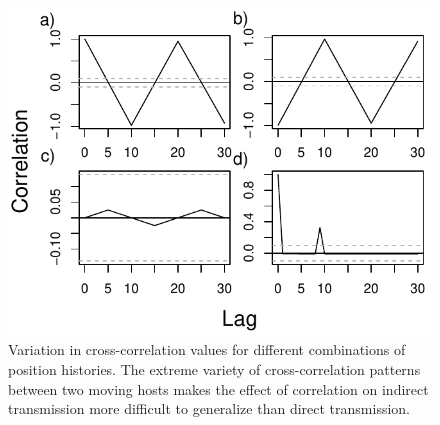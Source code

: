\documentclass[11pt]{article}
\begin{document}



\clearpage

\begin{figure}
    \includegraphics[width=\textwidth]{figures/example_xcorrs.pdf}
    \caption{Variation in cross-correlation values for different combinations of position histories. The extreme variety of cross-correlation patterns between two moving hosts makes the effect of correlation on indirect transmission more difficult to generalize than direct transmission.}
    \label{fig:xcorrs}
\end{figure}
\end{document}
